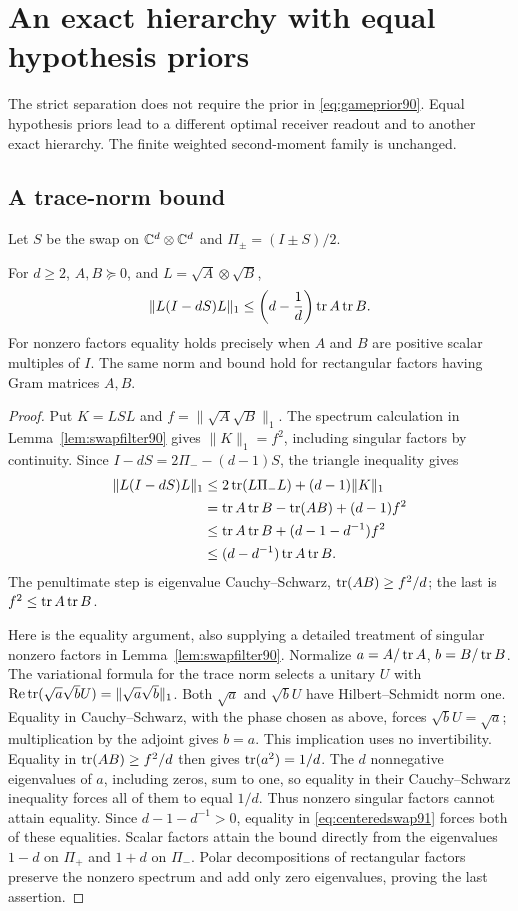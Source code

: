 \section{An exact hierarchy with equal hypothesis priors}
\label{sec:equalprior91}
The strict separation does not require the prior in
\eqref{eq:gameprior90}.  Equal hypothesis priors lead to a different
optimal receiver readout and to another exact hierarchy.  The finite
weighted second-moment family is unchanged.

\subsection{A trace-norm bound}
Let $S$ be the swap on $\mathbb C^d\otimes\mathbb C^d$ and
$\Pi_\pm=(I\pm S)/2$.
\begin{lemma}\label{lem:centeredswap91}
For $d\ge2$, $A,B\succeq0$, and $L=\sqrt A\otimes\sqrt B$,
\begin{equation}\label{eq:centeredswap91}
 \|L(I-dS)L\|_1\le\left(d-\frac1d\right)\operatorname{tr} A\operatorname{tr} B.
\end{equation}
For nonzero factors equality holds precisely when $A$ and $B$ are
positive scalar multiples of $I$.  The same norm and bound hold for
rectangular factors having Gram matrices $A,B$.
\end{lemma}
\begin{proof}
Put $K=LSL$ and $f=\|\sqrt A\sqrt B\|_1$.
The spectrum calculation in Lemma~\ref{lem:swapfilter90} gives
$\|K\|_1=f^2$, including singular factors by continuity.
Since $I-dS=2\Pi_--(d-1)S$, the triangle inequality gives
\begin{align*}
 \|L(I-dS)L\|_1
 &\le 2\operatorname{tr}(L\Pi_-L)+(d-1)\|K\|_1\\
 &=\operatorname{tr} A\operatorname{tr} B-\operatorname{tr}(AB)+(d-1)f^2\\
 &\le\operatorname{tr} A\operatorname{tr} B+(d-1-d^{-1})f^2\\
 &\le(d-d^{-1})\operatorname{tr} A\operatorname{tr} B.
\end{align*}
The penultimate step is eigenvalue Cauchy--Schwarz,
$\operatorname{tr}(AB)\ge f^2/d$; the last is $f^2\le\operatorname{tr} A\operatorname{tr} B$.

Here is the equality argument, also supplying a detailed treatment of
singular nonzero factors in Lemma~\ref{lem:swapfilter90}.
Normalize $a=A/\operatorname{tr} A$, $b=B/\operatorname{tr} B$.  The variational formula for the
trace norm selects a unitary $U$ with
$\operatorname{Re}\operatorname{tr}(\sqrt a\sqrt b U)=\|\sqrt a\sqrt b\|_1$.
Both $\sqrt a$ and $\sqrt b U$ have Hilbert--Schmidt norm one.
Equality in Cauchy--Schwarz, with the phase chosen as above, forces
$\sqrt b U=\sqrt a$; multiplication by the adjoint gives $b=a$.
This implication uses no invertibility.  Equality in
$\operatorname{tr}(AB)\ge f^2/d$ then gives $\operatorname{tr}(a^2)=1/d$.  The $d$
nonnegative eigenvalues of $a$, including zeros, sum to one, so equality
in their Cauchy--Schwarz inequality forces all of them to equal $1/d$.
Thus nonzero singular factors cannot attain equality.  Since
$d-1-d^{-1}>0$, equality in \eqref{eq:centeredswap91} forces both
of these equalities.  Scalar factors attain the bound directly from
the eigenvalues $1-d$ on $\Pi_+$ and $1+d$ on $\Pi_-$.
Polar decompositions of rectangular factors preserve the nonzero
spectrum and add only zero eigenvalues, proving the last assertion.
\end{proof}

